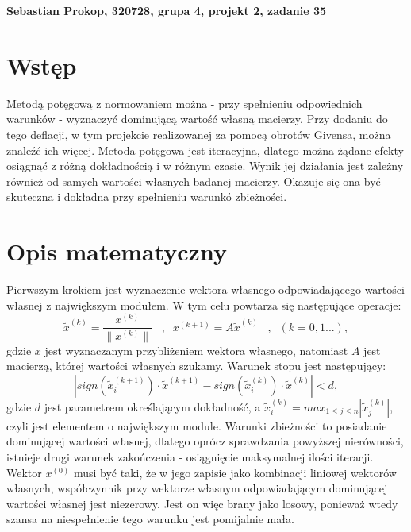 \documentclass[a4paper,12pt]{article}
\begin{document}
\def\tablename{Tabela} %
\noindent
\textbf{Sebastian Prokop, 320728, grupa 4, projekt 2, zadanie 35}


\section*{Wstęp}
Metodą potęgową z normowaniem można - przy spełnieniu odpowiednich warunków - wyznaczyć dominującą wartość własną macierzy. Przy dodaniu do tego deflacji, w tym projekcie realizowanej za pomocą obrotów Givensa, można znaleźć ich więcej. Metoda potęgowa jest iteracyjna, dlatego można żądane efekty osiągnąć z różną dokładnością i w różnym czasie. Wynik jej działania jest zależny również od samych wartości własnych badanej macierzy. Okazuje się ona być skuteczna i dokładna przy spełnieniu warunkó zbieżności.

\section*{Opis matematyczny}
Pierwszym krokiem jest wyznaczenie wektora własnego odpowiadającego wartości własnej z największym modułem. W tym celu powtarza się następujące operacje:
\[ \widetilde{x}^{(k)} = \frac{x^{(k)}}{\lVert x^{(k)} \rVert} \;\;\; , \;\; x^{(k+1)} = A\widetilde{x}^{(k)} \;\;\; , \;\; (k = 0,1...), \]
gdzie $x$ jest wyznaczanym przybliżeniem wektora własnego, natomiast $A$ jest macierzą, której wartości własnych szukamy. Warunek stopu jest następujący:
\[ |sign(\widetilde{x}_i^{(k+1)}) \cdot \widetilde{x}^{(k+1)} - sign(\widetilde{x}_i^{(k)}) \cdot \widetilde{x}^{(k)}|<d,\]
gdzie $d$ jest parametrem określającym dokładność, a $\widetilde{x}_i^{(k)} = max_{1\leq j\leq n}|\widetilde{x}_j^{(k)}|$, czyli jest elementem o największym module. Warunki zbieżności to posiadanie dominującej wartości własnej, dlatego oprócz sprawdzania powyższej nierówności, istnieje drugi warunek zakończenia - osiągnięcie maksymalnej ilości iteracji. Wektor $x^{(0)}$ musi być taki, że w jego zapisie jako kombinacji liniowej wektorów własnych, współczynnik przy wektorze własnym odpowiadającym dominującej wartości własnej jest niezerowy. Jest on więc brany jako losowy, ponieważ wtedy szansa na niespełnienie tego warunku jest pomijalnie mała.
\end{document}
